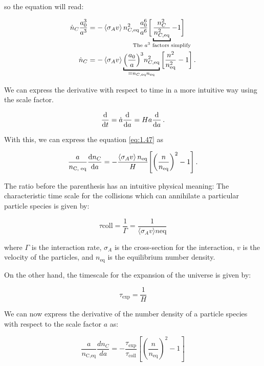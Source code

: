 so the equation will read:

\begin{align}
    \dot{n}_C \frac{a_0^3}{a^3} &= -\expval{\sigma _A v} n _{C, \text{eq}}^2 \frac{a_0^{6}}{a^{6}} \bigg[\underbracket{\frac{n_C^2}{n _{C, \text{eq}}^2}}_{\mathclap{\text{The \(a^3\) factors simplify}}} - 1\bigg] \\
    \dot{n}_C &= - \expval{\sigma _A v } \underbracket{\qty(\frac{a_0 }{a})^3 n _{C, \text{eq}}^2}_{ = n_{C, \text{eq}} n _{\text{eq}}} \qty[\frac{n^2}{n _{ \text{eq}}^2} - 1] \,.\label{eq:1.47}
\end{align}

We can express the derivative with respect to time in a more intuitive way using the scale factor.

\begin{align}
\dv{}{t} = \dot{a}\dv{}{a} = H a \dv{}{a}
\,.
\end{align}

With this, we can express the equation \ref{eq:1.47} as

\begin{align}
    \frac{a}{n _{\text{C, eq}}} \dv{n_C}{a} = - \frac{\expval{\sigma _A v }n _{\text{eq}}}{H} \qty[\qty(\frac{n}{n _{\text{eq}}})^2- 1]\,. \label{eq:1.49}
\end{align}

The ratio before the parenthesis has an intuitive physical meaning:
The characteristic time scale for the collisions which can annihilate a particular particle species is given by:

\begin{equation}
\tau {\text{coll}} = \frac{1}{\Gamma} = \frac{1}{\langle \sigma_A v \rangle n{\text{eq}}}
\end{equation}

where $\Gamma$ is the interaction rate, $\sigma_A$ is the cross-section for the interaction, $v$ is the velocity of the particles, and $n_{\text{eq}}$ is the equilibrium number density.

On the other hand, the timescale for the expansion of the universe is given by:

\begin{equation}
\tau _{\text{exp}} = \frac{1}{H}
\end{equation}

We can now express the derivative of the number density of a particle species with respect to the scale factor $a$ as:

\begin{equation}
\frac{a}{n_{\text{C,eq}}} \frac{dn_C}{da} = -\frac{\tau_{\text{exp}}}{\tau_{\text{coll}}} \left[\left(\frac{n}{n_{\text{eq}}}\right)^2 - 1 \right]
\end{equation}

